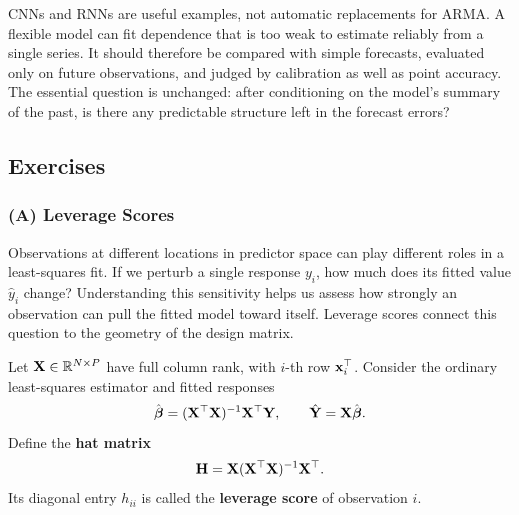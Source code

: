CNNs and RNNs are useful examples, not automatic replacements for ARMA. A flexible
model can fit dependence that is too weak to estimate reliably from a single
series. It should therefore be compared with simple forecasts, evaluated only on
future observations, and judged by calibration as well as point accuracy. The
essential question is unchanged: after conditioning on the model's summary of the
past, is there any predictable structure left in the forecast errors?

\clearpage
\subsection{Exercises}
\label{sec:classical-model-exercises}

\subsubsection*{(A) Leverage Scores}
{}
\label{ex:leverage-scores}

Observations at different locations in predictor space can play different roles
in a least-squares fit. If we perturb a single response $y_i$, how much does its
fitted value $\hat y_i$ change? Understanding this sensitivity helps us assess
how strongly an observation can pull the fitted model toward itself. Leverage
scores connect this question to the geometry of the design matrix.

Let $\mathbf{X}\in\mathbb R^{N\times P}$ have full column rank, with $i$-th row
$\mathbf{x}_i^\top$. Consider the ordinary least-squares estimator and fitted responses
\[
    \hat{\boldsymbol\beta}
    =(\mathbf{X}^\top\mathbf{X})^{-1}\mathbf{X}^\top\mathbf{Y},
    \qquad
    \hat{\mathbf{Y}}=\mathbf{X}\hat{\boldsymbol\beta}.
\]
Define the \textbf{hat matrix}
\[
    \mathbf H=\mathbf{X}(\mathbf{X}^\top\mathbf{X})^{-1}\mathbf{X}^\top.
\]
Its diagonal entry $h_{ii}$ is called the \textbf{leverage score} of observation $i$.

